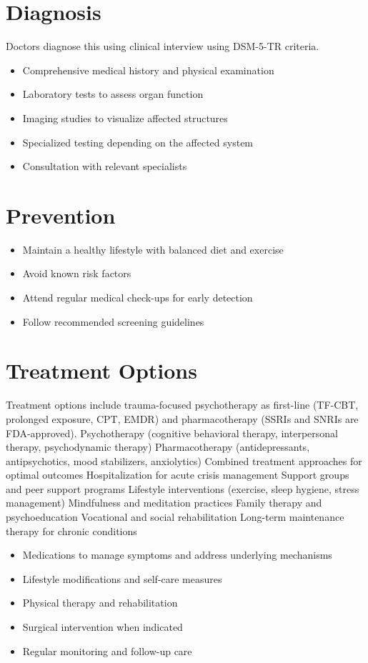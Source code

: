 \section{Diagnosis}
Doctors diagnose this using clinical interview using DSM-5-TR criteria.

\begin{itemize}[noitemsep]
  \item Comprehensive medical history and physical examination
  \item Laboratory tests to assess organ function
  \item Imaging studies to visualize affected structures
  \item Specialized testing depending on the affected system
  \item Consultation with relevant specialists
\end{itemize}
\section{Prevention}
\begin{itemize}[noitemsep]
  \item Maintain a healthy lifestyle with balanced diet and exercise
  \item Avoid known risk factors
  \item Attend regular medical check-ups for early detection
  \item Follow recommended screening guidelines
\end{itemize}
\section{Treatment Options}
Treatment options include trauma-focused psychotherapy as first-line (TF-CBT, prolonged exposure, CPT, EMDR) and pharmacotherapy (SSRIs and SNRIs are FDA-approved). Psychotherapy (cognitive behavioral therapy, interpersonal therapy, psychodynamic therapy) Pharmacotherapy (antidepressants, antipsychotics, mood stabilizers, anxiolytics) Combined treatment approaches for optimal outcomes Hospitalization for acute crisis management Support groups and peer support programs Lifestyle interventions (exercise, sleep hygiene, stress management) Mindfulness and meditation practices Family therapy and psychoeducation Vocational and social rehabilitation Long-term maintenance therapy for chronic conditions

\begin{itemize}[noitemsep]
  \item Medications to manage symptoms and address underlying mechanisms
  \item Lifestyle modifications and self-care measures
  \item Physical therapy and rehabilitation
  \item Surgical intervention when indicated
  \item Regular monitoring and follow-up care
\end{itemize}
